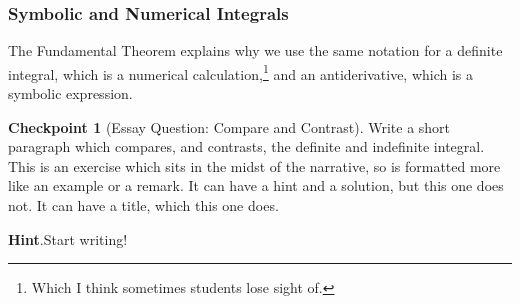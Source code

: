 \documentclass{amsart}
\theoremstyle{plain}%
\theoremstyle{definition}%
\newtheorem{inlineexercise}[theorem]{Checkpoint}
\theoremstyle{remark}%
\newcommand{\blocktitlefont}{\relax}
\numberwithin{equation}{section}
\begin{document}
\subsubsection{Symbolic and Numerical Integrals}\label{subsubsection-different-integrals}%
The Fundamental Theorem explains why we use the same notation for a definite integral, which is a numerical calculation,\footnote{Which I think sometimes students lose sight of.\label{subsubsection-different-integrals-2-1}} and an antiderivative, which is a symbolic expression.%
\begin{inlineexercise}[Essay Question: Compare and Contrast]\label{exercise-essay}%
%
Write a short paragraph which compares, and contrasts, the definite and indefinite integral. This is an exercise which sits in the midst of the narrative, so is formatted more like an example or a remark.  It can have a hint and a solution, but this one does not.  It can have a title, which this one does.%
\par\smallskip%
\noindent\textbf{\blocktitlefont Hint}.\hypertarget{exercise-essay-3}{}\quad{}Start writing!%
\end{inlineexercise}%
%
%
\typeout{************************************************}
\typeout{************************************************}
%
\end{document}
